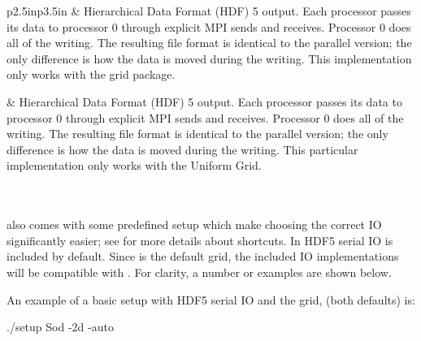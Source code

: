 \begin{longtable}{p{2.5in}p{3.5in}}
   & Hierarchical Data Format (HDF) 5 output.
                             Each processor passes its data to
                             processor 0 through explicit MPI sends
                             and receives. Processor 0 does all of the
                             writing. The resulting file format is
                             identical to the parallel version; the
                             only difference is how the data is moved
                             during the writing. This 
                             implementation only works with the
                             \amrex grid package.\ieor

   & Hierarchical Data Format (HDF) 5 output.
                             Each processor passes its data to
                             processor 0 through explicit MPI sends
                             and receives. Processor 0 does all of the
                             writing. The resulting file format is
                             identical to the parallel version; the
                             only difference is how the data is moved
                             during the writing. This particular
                             implementation only works with the
                             Uniform Grid.\\


 \\




\\[1mm]

\hline
\end{longtable}
\normalsize

\flashx also comes with some predefined setup 
which make  choosing the correct
IO significantly easier; see  for more details about shortcuts. In \flashx HDF5 serial IO is
included by default.  Since  is the default grid, the
included IO implementations will be compatible with .  For
clarity, a number or examples are shown below.

\label{IO:example setups}

An example of a basic setup with HDF5 serial IO and the \Paramesh grid, (both defaults) is:
\begin{codeseg}
./setup Sod -2d -auto
\end{codeseg}

